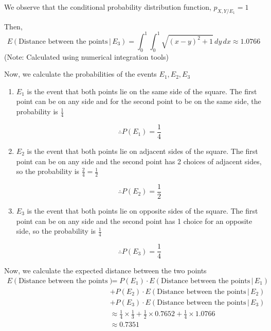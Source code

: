 \documentclass[12pt, oneside]{article}
\begin{document}
\begin{enumerate}
{\begin{enumerate}
{            We observe that the conditional probability distribution function,
            \(p_{X, Y / E_1} = 1\) 

            Then, \[
                E(\text{Distance between the points} \,|\, E_3) = \int_{0}^{1} \int_{0}^{1}
                   \sqrt{(x-y)^2 + 1} \,dy \,dx \approx 1.0766
            \]
            \hfill (Note: Calculated using numerical integration tools)
        }
    \end{enumerate}

    Now, we calculate the probabilities of the events \(E_1, E_2, E_3\)

    \begin{enumerate}
        \item {
            \(E_1\) is the event that both points lie on the same side of the square.
            The first point can be on any side and for the second point to be on
            the same side, the probability is \(\frac{1}{4}\)

            \[\therefore P(E_1) = \frac{1}{4}\]
        }
        \item {
            \(E_2\) is the event that both points lie on adjacent sides of the square.
            The first point can be on any side and the second point has 2 choices of
            adjacent sides, so the probability is \(\frac{2}{4} = \frac{1}{2}\)

            \[\therefore P(E_2) = \frac{1}{2}\]
        }
        \item {
            \(E_3\) is the event that both points lie on opposite sides of the square.
            The first point can be on any side and the second point has 1 choice for an
            opposite side, so the probability is \(\frac{1}{4}\)

            \[\therefore P(E_3) = \frac{1}{4}\]
        }
    \end{enumerate}

    Now, we calculate the expected distance between the two points
    \begin{align*}
        E(\text{Distance between the points}) &= P(E_1) \cdot E(\text{Distance between the points} \,|\, E_1) \\
                                              &+ P(E_2) \cdot E(\text{Distance between the points} \,|\, E_2) \\
                                              &+ P(E_3) \cdot E(\text{Distance between the points} \,|\, E_3) \\
                                              &\approx \frac{1}{4} \times \frac{1}{3} + \frac{1}{2} \times 0.7652
                                                   + \frac{1}{4} \times 1.0766 \\
                                              &\approx 0.7351
    \end{align*}
}


\end{enumerate}
\end{document}
